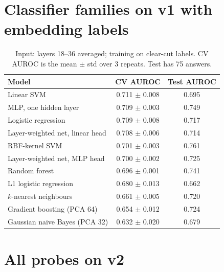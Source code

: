 \documentclass[11pt]{article}
\begin{document}
\section{Classifier families on v1 with embedding labels}
\label{app:v1models}
\begin{table}[H]
  \centering\small
  \caption{Input: layers 18--36 averaged; training on clear-cut labels. CV AUROC is the mean $\pm$ std over 3 repeats. Test has 75 answers.}
  \begin{tabular}{lcc}
    \toprule
    Model & CV AUROC & Test AUROC \\
    \midrule
    Linear SVM & 0.711 $\pm$ 0.008 & 0.695 \\
    MLP, one hidden layer & 0.709 $\pm$ 0.003 & 0.749 \\
    Logistic regression & 0.709 $\pm$ 0.008 & 0.717 \\
    Layer-weighted net, linear head & 0.708 $\pm$ 0.006 & 0.714 \\
    RBF-kernel SVM & 0.701 $\pm$ 0.003 & 0.761 \\
    Layer-weighted net, MLP head & 0.700 $\pm$ 0.002 & 0.725 \\
    Random forest & 0.696 $\pm$ 0.001 & 0.741 \\
    L1 logistic regression & 0.680 $\pm$ 0.013 & 0.662 \\
    $k$-nearest neighbours & 0.661 $\pm$ 0.005 & 0.720 \\
    Gradient boosting (PCA 64) & 0.654 $\pm$ 0.012 & 0.724 \\
    Gaussian naive Bayes (PCA 32) & 0.632 $\pm$ 0.020 & 0.679 \\
    \bottomrule
  \end{tabular}
\end{table}

\section{All probes on v2}
\label{app:v2}
\begin{table}[H]
  \centering\scriptsize
  \caption{All v2 probes (LLM-judge labels, 3,950 answers), sorted by CV AUROC. Acc.\ in \%. Majority-class: val 62\%, test 61\%.}
  \resizebox{\linewidth}{!}{}
\end{table}
\end{document}
